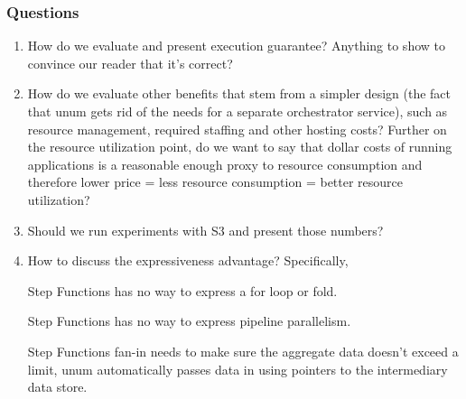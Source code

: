\subsubsection{Questions}

\begin{enumerate}

    \item How do we evaluate and present execution guarantee? Anything to show
     to convince our reader that it's correct?

    \item How do we evaluate other benefits that stem from a simpler design
     (the fact that unum gets rid of the needs for a separate orchestrator
     service), such as resource management, required staffing and other
     hosting costs? Further on the resource utilization point, do we want to
     say that dollar costs of running applications is a reasonable enough
     proxy to resource consumption and therefore lower price = less resource
     consumption = better resource utilization?

    \item Should we run experiments with S3 and present those numbers?

    \item How to discuss the expressiveness advantage? Specifically,

        Step Functions has no way to express a for loop or fold.

        Step Functions has no way to express pipeline parallelism.

        Step Functions fan-in needs to make sure the aggregate data doesn't exceed a
        limit, unum automatically passes data in using pointers to the intermediary
        data store.

\end{enumerate}

